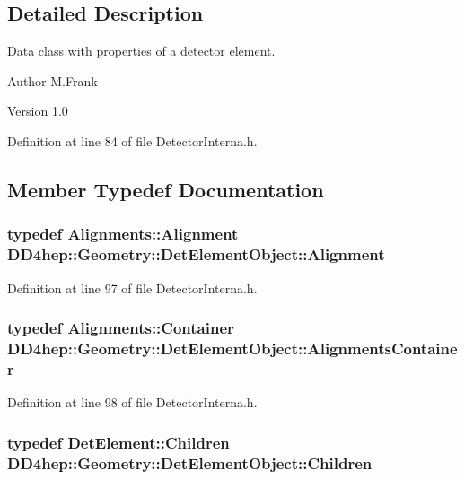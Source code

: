 \subsection{Detailed Description}
Data class with properties of a detector element. \begin{DoxyAuthor}{Author}
M.Frank 
\end{DoxyAuthor}
\begin{DoxyVersion}{Version}
1.0 
\end{DoxyVersion}


Definition at line 84 of file DetectorInterna.h.

\subsection{Member Typedef Documentation}
\hypertarget{class_d_d4hep_1_1_geometry_1_1_det_element_object_aaf1bb49d0e1799f548f775b35e3cb590}{
\subsubsection[{Alignment}]{\setlength{\rightskip}{0pt plus 5cm}typedef {\bf Alignments::Alignment} {\bf DD4hep::Geometry::DetElementObject::Alignment}}}
\label{class_d_d4hep_1_1_geometry_1_1_det_element_object_aaf1bb49d0e1799f548f775b35e3cb590}


Definition at line 97 of file DetectorInterna.h.\hypertarget{class_d_d4hep_1_1_geometry_1_1_det_element_object_ab920e3c690de8d093cb556b0d3c87ce8}{
\subsubsection[{AlignmentsContainer}]{\setlength{\rightskip}{0pt plus 5cm}typedef {\bf Alignments::Container} {\bf DD4hep::Geometry::DetElementObject::AlignmentsContainer}}}
\label{class_d_d4hep_1_1_geometry_1_1_det_element_object_ab920e3c690de8d093cb556b0d3c87ce8}


Definition at line 98 of file DetectorInterna.h.\hypertarget{class_d_d4hep_1_1_geometry_1_1_det_element_object_aaf04a1f51d7a7ce4c0e0dc4863268d8a}{
\subsubsection[{Children}]{\setlength{\rightskip}{0pt plus 5cm}typedef {\bf DetElement::Children} {\bf DD4hep::Geometry::DetElementObject::Children}}}
\label{class_d_d4hep_1_1_geometry_1_1_det_element_object_aaf04a1f51d7a7ce4c0e0dc4863268d8a}


